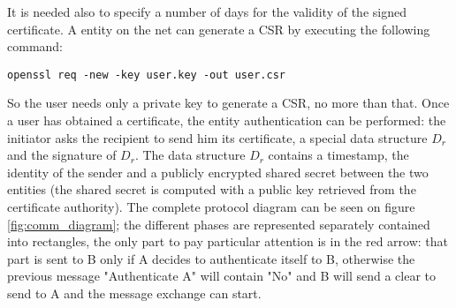 \documentclass{article}
\begin{document}
It is needed also to specify a number of days for the validity of the signed certificate.\newline
A entity on the net can generate a CSR by executing the following command:

\begin{lstlisting}[breaklines]
	openssl req -new -key user.key -out user.csr
\end{lstlisting}

So the user needs only a private key to generate a CSR, no more than that. Once a user has obtained a certificate, the entity authentication can be performed: the initiator asks the recipient to send him its certificate, a special data structure \textit{$D_r$} and the signature of \textit{$D_r$}. The data structure \textit{$D_r$} contains a timestamp, the identity of the sender and a publicly encrypted shared secret between the two entities (the shared secret is computed with a public key retrieved from the certificate authority).\newline
The complete protocol diagram can be seen on figure \ref{fig:comm_diagram}; the different phases are represented separately contained into rectangles, the only part to pay particular attention is in the red arrow: that part is sent to B only if A decides to authenticate itself to B, otherwise the previous message "Authenticate A" will contain "No" and B will send a clear to send to A and the message exchange can start.
\end{document}
